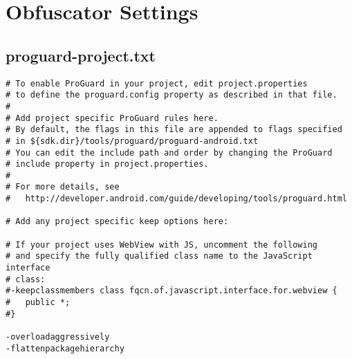 \section{Obfuscator Settings}
\label{app:obfuscator}
\subsection{proguard-project.txt}
\label{app:opp}
\begin{lstlisting}
# To enable ProGuard in your project, edit project.properties
# to define the proguard.config property as described in that file.
#
# Add project specific ProGuard rules here.
# By default, the flags in this file are appended to flags specified
# in ${sdk.dir}/tools/proguard/proguard-android.txt
# You can edit the include path and order by changing the ProGuard
# include property in project.properties.
#
# For more details, see
#   http://developer.android.com/guide/developing/tools/proguard.html

# Add any project specific keep options here:

# If your project uses WebView with JS, uncomment the following
# and specify the fully qualified class name to the JavaScript interface
# class:
#-keepclassmembers class fqcn.of.javascript.interface.for.webview {
#   public *;
#}

-overloadaggressively
-flattenpackagehierarchy
\end{lstlisting}

